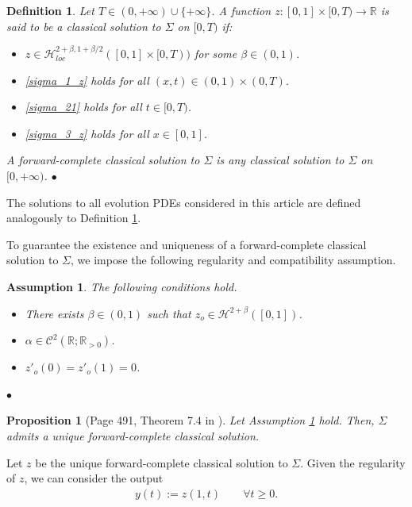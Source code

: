 \documentclass[twocolumn]{autart}
\newtheorem{propo}{Proposition}
\newtheorem{ass}{Assumption}
\newtheorem{defin}{Definition}
\newenvironment{assumption}{\begin{ass}}{\end{ass}}
\newenvironment{proposition}{\begin{propo}}{\hfill   \end{propo}}
\begin{document}
\begin{defin}\label{def_classical}
Let $T\in (0,+\infty) \cup \{+\infty\}$. A function $z: [0,1]\times [0,T)\to \mathbb{R}$ is said to be a classical solution to $\Sigma$ on $[0,T)$ if: 
\begin{itemize}
    \item $z\in \mathscr{H}_{loc}^{2+\beta, 1+\beta/2}([0,1]\times [0,T))$ for some $\beta \in (0,1)$.
    \item \eqref{sigma_1_z} holds for all $(x,t) \in (0,1)\times (0,T)$. 
    \item \eqref{sigma_21} holds for all $t\in [0,T)$. 
    \item \eqref{sigma_3_z} holds for all $x\in [0,1]$.
\end{itemize}
A forward-complete classical solution to $\Sigma$ is any classical solution to $\Sigma$ on $[0,+\infty)$.
\hfill $\bullet$
\end{defin}

The solutions to all evolution PDEs considered in this article are defined analogously to Definition \ref{def_classical}.

To guarantee the existence and uniqueness of a forward-complete classical solution to $\Sigma$, we impose the following regularity and compatibility assumption.

\begin{assumption}\label{ass_1}
The following conditions hold.
\begin{itemize}
    \item There exists $\beta \in (0,1)$ such that
    $z_o\in \mathscr{H}^{2+\beta}([0,1])$.
    \item $\alpha \in \mathscr{C}^2(\mathbb{R};\mathbb{R}_{>0})$.
    \item $z'_o(0)=z'_o(1)=0$.
\end{itemize}
\hfill $\bullet$
\end{assumption} 

\begin{proposition}[Page 491, Theorem 7.4 in \cite{ladyzen}]
    Let Assumption \ref{ass_1} hold. Then, $\Sigma$ admits a unique forward-complete classical solution. 
\end{proposition}

Let $z$ be the unique forward-complete classical solution to $\Sigma$. Given the regularity of $z$, we can consider the output
\begin{align}
y(t) := z(1,t) \qquad \forall t\geq 0. 
\end{align}
\end{document}
